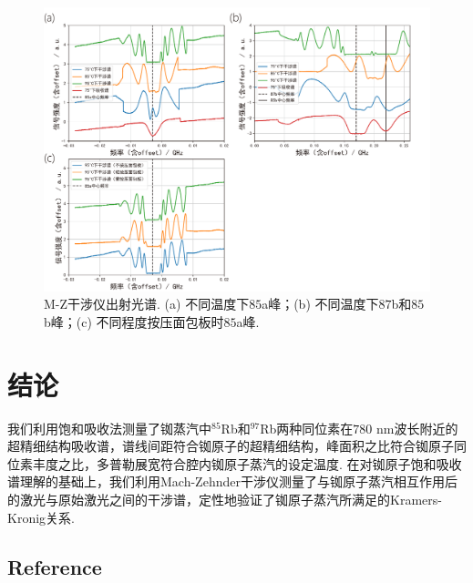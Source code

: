 \documentclass[a4paper, 10pt]{article}
\begin{document}
\begin{multicols*}{2}
\begin{figure}[H]
    \centering
    \includegraphics[width=.9\columnwidth]{M-Z-InterferenceSpectrum.pdf}
    \caption{M-Z干涉仪出射光谱. (a) 不同温度下$85$a峰；(b) 不同温度下$87$b和$85$b峰；(c) 不同程度按压面包板时$85$a峰.}
    \label{M-Z-InterferenceSpectrum}
\end{figure}

\section{结论}
我们利用饱和吸收法测量了铷蒸汽中$^{85}$Rb和$^{97}$Rb两种同位素在$780$ nm波长附近的超精细结构吸收谱，谱线间距符合铷原子的超精细结构，峰面积之比符合铷原子同位素丰度之比，多普勒展宽符合腔内铷原子蒸汽的设定温度. 在对铷原子饱和吸收谱理解的基础上，我们利用Mach-Zehnder干涉仪测量了与铷原子蒸汽相互作用后的激光与原始激光之间的干涉谱，定性地验证了铷原子蒸汽所满足的Kramers-Kronig关系.

\begin{appendix}
\section*{Reference}
\nocite{*}


\end{appendix}
\end{multicols*}
\end{document}
